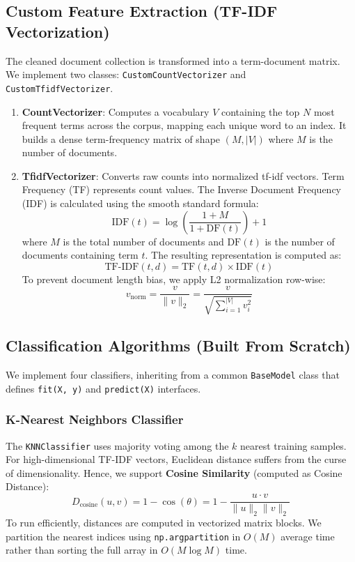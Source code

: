 \documentclass[conference]{IEEEtran}
\begin{document}
\subsection{Custom Feature Extraction (TF-IDF Vectorization)}
The cleaned document collection is transformed into a term-document matrix. We implement two classes: \texttt{CustomCountVectorizer} and \texttt{CustomTfidfVectorizer}.
\begin{enumerate}
\item \textbf{CountVectorizer}: Computes a vocabulary $V$ containing the top $N$ most frequent terms across the corpus, mapping each unique word to an index. It builds a dense term-frequency matrix of shape $(M, |V|)$ where $M$ is the number of documents.
\item \textbf{TfidfVectorizer}: Converts raw counts into normalized tf-idf vectors. Term Frequency (TF) represents count values. The Inverse Document Frequency (IDF) is calculated using the smooth standard formula:
\begin{equation}
\text{IDF}(t) = \log\left(\frac{1 + M}{1 + \text{DF}(t)}\right) + 1
\end{equation}
where $M$ is the total number of documents and $\text{DF}(t)$ is the number of documents containing term $t$. The resulting representation is computed as:
\begin{equation}
\text{TF-IDF}(t, d) = \text{TF}(t, d) \times \text{IDF}(t)
\end{equation}
To prevent document length bias, we apply L2 normalization row-wise:
\begin{equation}
v_{\text{norm}} = \frac{v}{\|v\|_2} = \frac{v}{\sqrt{\sum_{i=1}^{|V|} v_i^2}}
\end{equation}
\end{enumerate}

\subsection{Classification Algorithms (Built From Scratch)}
We implement four classifiers, inheriting from a common \texttt{BaseModel} class that defines \texttt{fit(X, y)} and \texttt{predict(X)} interfaces.

\subsubsection{K-Nearest Neighbors Classifier}
The \texttt{KNNClassifier} uses majority voting among the $k$ nearest training samples. For high-dimensional TF-IDF vectors, Euclidean distance suffers from the curse of dimensionality. Hence, we support \textbf{Cosine Similarity} (computed as Cosine Distance):
\begin{equation}
D_{\text{cosine}}(u, v) = 1 - \cos(\theta) = 1 - \frac{u \cdot v}{\|u\|_2 \|v\|_2}
\end{equation}
To run efficiently, distances are computed in vectorized matrix blocks. We partition the nearest indices using \texttt{np.argpartition} in $O(M)$ average time rather than sorting the full array in $O(M \log M)$ time.
\end{document}
